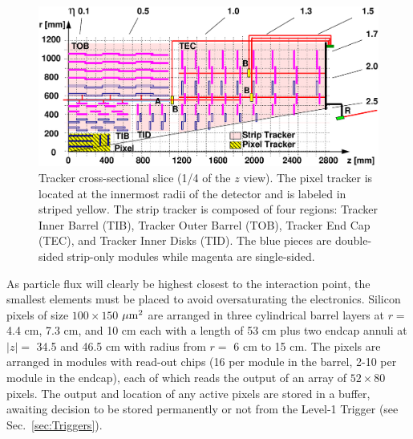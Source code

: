 \begin{figure}[htbp]
\begin{center}
\includegraphics[width=.8\linewidth]{Experiment/figures/TrackerSystemLAS.eps}
\caption[Geometry of the Tracker System]{Tracker cross-sectional slice (1/4 of the $z$ view). The pixel tracker is located at the innermost radii of the detector and is labeled in striped yellow. The strip tracker is composed of four regions: Tracker Inner Barrel (TIB), Tracker Outer Barrel (TOB), Tracker End Cap (TEC), and Tracker Inner Disks (TID). The blue pieces are double-sided strip-only modules while magenta are single-sided.}
\label{fig:TrackerSystem}
\end{center}
\end{figure}

As particle flux will clearly be highest closest to the interaction point, the smallest elements must be placed to avoid oversaturating the electronics. Silicon pixels of size $100\times150$ $\mu\rm{m}^2$ are arranged in three cylindrical barrel layers at $r=$ 4.4 cm, 7.3 cm, and 10 cm each with a length of 53 cm plus two endcap annuli at $|z|=$ 34.5 and 46.5 cm with radius from $r=$ 6 cm to 15 cm. The pixels are arranged in modules with read-out chips (16 per module in the barrel, 2-10 per module in the endcap), each of which reads the output of an array of $52\times80$ pixels. The output and location of any active pixels are stored in a buffer, awaiting decision to be stored permanently or not from the Level-1 Trigger (see Sec.~\ref{sec:Triggers}).

